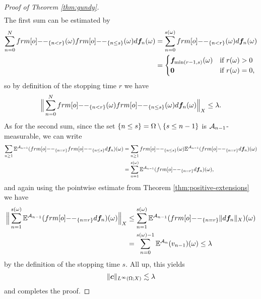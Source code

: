 \begin{proof}[Proof of Theorem \ref{thm:gundy}]
\begin{equation*}
\begin{aligned}
    \end{aligned}
  \end{equation*}
  The first sum can be estimated by
  \begin{equation*}
    \begin{aligned}
      \sum_{n=0}^{N} \1_{\{n < r\}}(\omega) \1_{\{n \leq s\}}(\omega) d\mb{f}_{n}(\omega)
      &= \sum_{n=0}^{s(\omega)} \1_{\{n < r\}}(\omega) d\mb{f}_{n}(\omega) \\
      &= \begin{cases}
        \mb{f}_{\min(r-1,s)}(\omega) & \text{if $r(\omega) > 0$} \\ \mb{0} & \text{if $r(\omega) = 0$,}
      \end{cases}
    \end{aligned}
  \end{equation*}
  so by definition of the stopping time $r$ we have
  \begin{equation*}
    \Big\| \sum_{n=0}^{N} \1_{\{n < r\}}(\omega) \1_{\{n \leq s\}}(\omega) d\mb{f}_{n}(\omega) \Big\|_{X} \leq \lambda.
  \end{equation*}
  As for the second sum, since the set $\{n \leq s\} = \Omega \setminus \{s \leq n-1\}$ is $\mathcal{A}_{n-1}$-measurable, we can write
  \begin{equation*}
    \begin{aligned}
      \sum_{n \geq 1} \E^{\mc{A}_{n-1}} (\1_{\{n = r\}} \1_{\{n \leq s\}} d\mb{f}_{n} )(\omega)
      &= \sum_{n \geq 1} \1_{\{n \leq s\}}(\omega) \E^{\mc{A}_{n-1}} (\1_{\{n = r\}}  d\mb{f}_{n} )(\omega) \\
      &= \sum_{n = 1}^{s(\omega)} \E^{\mc{A}_{n-1}} (\1_{\{n = r\}}  d\mb{f}_{n} )(\omega),
    \end{aligned}
  \end{equation*}
  and again using the pointwise estimate from Theorem \ref{thm:positive-extensions} we have
  \begin{equation*}
    \begin{aligned}
      \Big\| \sum_{n = 1}^{s(\omega)} \E^{\mc{A}_{n-1}} (\1_{\{n = r\}}  d\mb{f}_{n} )(\omega) \Big\|_{X}
      &\leq \sum_{n=1}^{s(\omega)} \E^{\mc{A}_{n-1}} (\1_{\{n = r\}} \|d\mb{f}_{n}\|_{X} )(\omega) \\
      &= \sum_{n=0}^{s(\omega) - 1} \E^{\mc{A}_{n}} (v_{n-1} )(\omega) \leq \lambda
    \end{aligned}
  \end{equation*}
  by the definition of the stopping time $s$.
  All up, this yields
  \begin{equation*}
    \|\bm{c}\|_{L^\infty(\Omega;X)} \lesssim \lambda
  \end{equation*}
  and completes the proof.
\end{proof}


